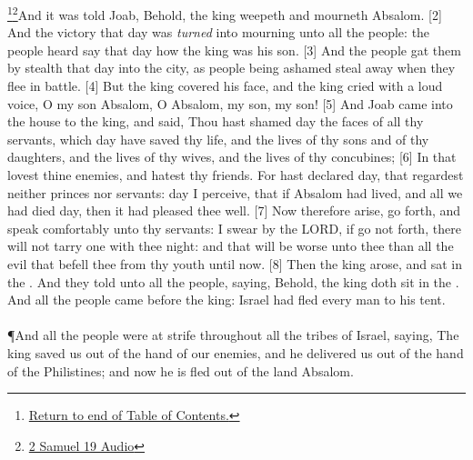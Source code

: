 \footnote{\textcolor[cmyk]{0.99998,1,0,0}{\hyperlink{TOC}{Return to end of Table of Contents.}}}\footnote{\href{https://audiobible.com/bible/2_samuel_19.html}{\textcolor[cmyk]{0.99998,1,0,0}{2 Samuel 19 Audio}}}\textcolor[cmyk]{0.99998,1,0,0}{And it was told Joab, Behold, the king weepeth and mourneth  Absalom.}
[2] \textcolor[cmyk]{0.99998,1,0,0}{And the victory that day was \emph{turned} into mourning unto all the people:  the people heard say that day how the king was   his son.}
[3] \textcolor[cmyk]{0.99998,1,0,0}{And the people gat them by stealth that day into the city, as people being ashamed steal away when they flee in battle.}
[4] \textcolor[cmyk]{0.99998,1,0,0}{But the king covered his face, and the king cried with a loud voice, O my son Absalom, O Absalom, my son, my son!}
[5] \textcolor[cmyk]{0.99998,1,0,0}{And Joab came into the house to the king, and said, Thou hast shamed  day the faces of all thy servants, which  day have saved thy life, and the lives of thy sons and of thy daughters, and the lives of thy wives, and the lives of thy concubines;}
[6] \textcolor[cmyk]{0.99998,1,0,0}{In that  lovest thine enemies, and hatest thy friends. For  hast declared  day, that  regardest neither princes nor servants:   day I perceive, that if Absalom had lived, and all we had died  day, then it had pleased thee well.}
[7] \textcolor[cmyk]{0.99998,1,0,0}{Now therefore arise, go forth, and speak comfortably unto thy servants:  I swear by the LORD, if  go not forth, there will not tarry one with thee  night: and that will be worse unto thee than all the evil that befell thee from thy youth until now.}
[8] \textcolor[cmyk]{0.99998,1,0,0}{Then the king arose, and sat in the . And they told unto all the people, saying, Behold, the king doth sit in the . And all the people came before the king:  Israel had fled every man to his tent.}\\
\\
\P \textcolor[cmyk]{0.99998,1,0,0}{And all the people were at strife throughout all the tribes of Israel, saying, The king saved us out of the hand of our enemies, and he delivered us out of the hand of the Philistines; and now he is fled out of the land  Absalom.}
